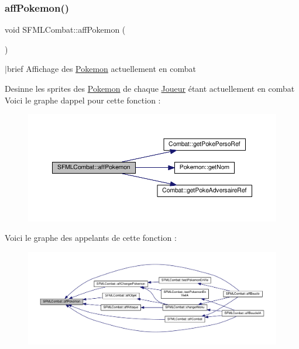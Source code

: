 \subsubsection{\texorpdfstring{aff\+Pokemon()}{affPokemon()}}
{\footnotesize\ttfamily void S\+F\+M\+L\+Combat\+::aff\+Pokemon (\begin{DoxyParamCaption}{ }\end{DoxyParamCaption})\hspace{0.3cm}{\ttfamily [private]}}

$\vert$brief Affichage des \hyperlink{class_pokemon}{Pokemon} actuellement en combat

Desinne les sprites des \hyperlink{class_pokemon}{Pokemon} de chaque \hyperlink{class_joueur}{Joueur} étant actuellement en combat Voici le graphe d\textquotesingle{}appel pour cette fonction \+:\nopagebreak
\begin{figure}[H]
\begin{center}
\leavevmode
\includegraphics[width=350pt]{class_s_f_m_l_combat_ab5de8e3048e2549352cea43a3ff636d4_cgraph}
\end{center}
\end{figure}
Voici le graphe des appelants de cette fonction \+:\nopagebreak
\begin{figure}[H]
\begin{center}
\leavevmode
\includegraphics[width=350pt]{class_s_f_m_l_combat_ab5de8e3048e2549352cea43a3ff636d4_icgraph}
\end{center}
\end{figure}
\mbox{\label{class_s_f_m_l_combat_ae641a09e3a5a8e50b3fe8352207e4748}} 
